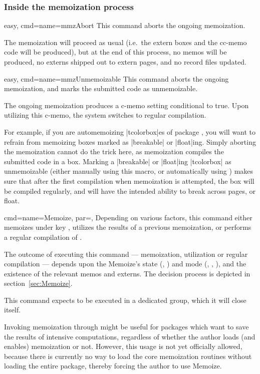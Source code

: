 \documentclass[a4paper,11pt]{article}
\begin{document}
\subsubsection{Inside the memoization process}
\label{sec:ref:memoization:process}

\begin{doc}{easy, cmd={name=mmzAbort}}
  This command aborts the ongoing memoization.

  The memoization will proceed as usual (i.e.\ the extern boxes and the cc-memo
  code will be produced), but at the end of this process, no memos will be
  produced, no externs shipped out to extern pages, and no record files
  updated.
\end{doc}

\begin{doc}{easy, cmd={name=mmzUnmemoizable}}
  This command aborts the ongoing memoization, and marks the submitted code as
  unmemoizable.

  The ongoing memoization produces a c-memo setting conditional
   to true.  Upon utilizing this c-memo, the
  system switches to regular compilation.

  For example, if you are automemoizing |tcolorbox|es of package
  , you will want to refrain from memoizing boxes marked as
  |breakable| or |float|ing.  Simply aborting the memoization cannot do the
  trick here, as memoization compiles the submitted code in a  box.
  Marking a |breakable| or |float|ing |tcolorbox| as unmemoizable (either
  manually using this macro, or automatically using ) makes
  sure that after the first compilation when memoization is attempted, the box
  will be compiled regularly, and will have the intended ability to break
  across pages, or float.
\end{doc}


\begin{doc}{
    cmd={name=Memoize, par=},
  }
  Depending on various factors, this command either memoizes  under
  key , utilizes the results of a previous memoization, or performs a
  regular compilation of .

  The outcome of executing this command --- memoization, utilization or regular
  compilation --- depends upon the Memoize's state (,
  ) and mode (, ,
  ), and the existence of the relevant memos and externs.
  The decision process is depicted in section~\ref{sec:Memoize}.

  This command expects to be executed in a dedicated group, which it will close
  itself.

  Invoking memoization through  might be useful for packages
  which want to save the results of intensive computations, regardless of
  whether the author loads (and enables) memoization or not.  However, this
  usage is not yet officially allowed, because there is currently no way to
  load the core memoization routines without loading the entire package,
  thereby forcing the author to use Memoize.
\end{doc}
\end{document}
